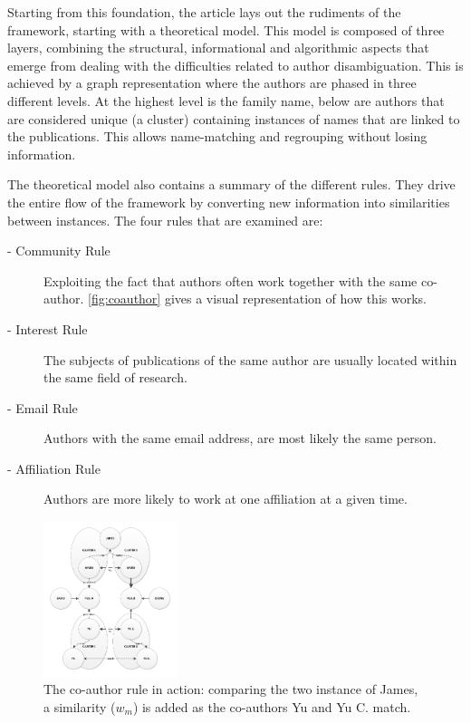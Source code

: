 \documentclass[9pt, twocolumn]{phdsymp} %
\begin{document}
Starting from this foundation, the article lays out the rudiments of the framework, starting with a theoretical model. This model is composed of three layers, combining the structural, informational and algorithmic aspects that emerge from dealing with the difficulties related to author disambiguation. This is achieved by a graph representation where the authors are phased in three different levels. At the highest level is the family name, below are authors that are considered unique (a cluster) containing instances of names that are linked to the publications. This allows name-matching and regrouping without losing information.

The theoretical model also contains a summary of the different rules. They drive the entire flow of the framework by converting new information into similarities between instances. The four rules that are examined are:

\begin{description}
	\item[- Community Rule] Exploiting the fact that authors often work together with the same co-author. \autoref{fig:coauthor} gives a visual representation of how this works.
	\item[- Interest Rule] The subjects of publications of the same author are usually located within the same field of research.
	\item[- Email Rule] Authors with the same email address, are most likely the same person.
	\item[- Affiliation Rule] Authors are more likely to work at one affiliation at a given time.
\end{description}

\begin{figure}[ht!]
	\centering
	\includegraphics[width= 0.35\textwidth]{fig/coauthorrulenameeq.pdf}
	\caption{The co-author rule in action: comparing the two instance of James, a similarity ($w_m$) is added as the co-authors Yu and Yu C. match.}
	\label{fig:pipes}
\end{figure}
\end{document}
